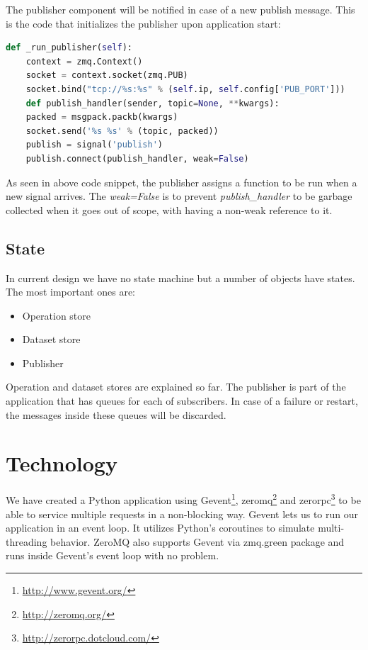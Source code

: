 The publisher component will be notified in case of a new publish message. 
This is the code that initializes the publisher upon application start:

\begin{lstlisting}[language=python, caption={Initializing the publisher upon application start}]
def _run_publisher(self):
    context = zmq.Context()
    socket = context.socket(zmq.PUB)
    socket.bind("tcp://%s:%s" % (self.ip, self.config['PUB_PORT']))
    def publish_handler(sender, topic=None, **kwargs):
	packed = msgpack.packb(kwargs)
	socket.send('%s %s' % (topic, packed))
    publish = signal('publish')
    publish.connect(publish_handler, weak=False)
\end{lstlisting}

As seen in above code snippet, the publisher assigns a function to be run when
a new signal arrives. The \textit{weak=False} is to prevent \textit{publish\_handler}
to be garbage collected when it goes out of scope, with having a non-weak reference to it.

\subsection{State}
In current design we have no state machine but a number of objects have states.
The most important ones are:
\begin{itemize}
\item Operation store
\item Dataset store
\item Publisher
\end{itemize}

Operation and dataset stores are explained so far. 
The publisher is part of the application that has queues for each of subscribers.
In case of a failure or restart, the messages inside these queues will be discarded.

\section{Technology}
We have created a Python application using Gevent\footnote{\url{http://www.gevent.org/}},
zeromq\footnote{\url{http://zeromq.org/}} and zerorpc\footnote{\url{http://zerorpc.dotcloud.com/}} 
to be able to service multiple requests in a non-blocking way. 
Gevent lets us to run our application in an event loop. 
It utilizes Python's coroutines to simulate multi-threading behavior. 
ZeroMQ also supports Gevent via zmq.green package and runs inside Gevent's event loop with no problem.

